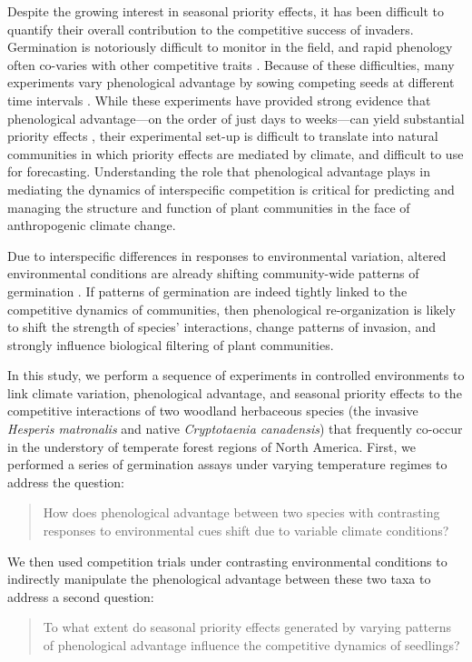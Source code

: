 \documentclass{article}[11pt]
\begin{document}
Despite the growing interest in seasonal priority effects, it has been difficult to quantify their overall contribution to the competitive success of invaders. Germination is notoriously difficult to monitor in the field, and rapid phenology often co-varies with other competitive traits \citep{Dickson2012,Milbau:2003vt,HAO:2009vh}. %
Because of these difficulties, many experiments vary phenological advantage by sowing competing seeds at different time intervals \citep{Young:2017aa}. While these experiments have provided strong evidence that phenological advantage---on the order of just days to weeks---can yield substantial priority effects \citep{Weidlich:2020aa}, their experimental set-up is difficult to translate into natural communities in which priority effects are mediated by climate, and difficult to use for forecasting. %
Understanding the role that phenological advantage plays in mediating the dynamics of interspecific competition is critical for predicting and managing the structure and function of plant communities in the face of anthropogenic climate change. 

Due to interspecific differences in responses to environmental variation, altered environmental conditions are already shifting community-wide patterns of germination \citep{Walck2011}. If patterns of germination are indeed tightly linked to the competitive dynamics of communities, then phenological re-organization is likely to shift the strength of species' interactions, change patterns of invasion, and strongly influence biological filtering of plant communities. 

In this study, we perform a sequence of experiments in controlled environments to link climate variation, phenological advantage, and seasonal priority effects to the competitive interactions of two woodland herbaceous species (the invasive \textit{Hesperis matronalis} and native \textit{Cryptotaenia canadensis}) that frequently co-occur in the understory of temperate forest regions of North America. First, we performed a series of germination assays under varying temperature regimes to address the question: 
\begin{quote}How does phenological advantage between two species with contrasting responses to environmental cues shift due to variable climate conditions?\end{quote}
We then used competition trials under contrasting environmental conditions to indirectly manipulate the phenological advantage between these two taxa to address a second question: \begin{quote}To what extent do seasonal priority effects generated by varying patterns of phenological advantage influence the competitive dynamics of seedlings?\end{quote}
\end{document}
